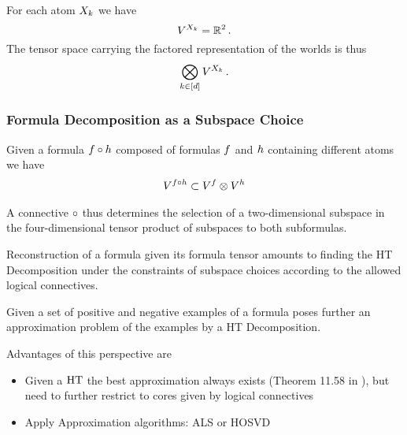For each atom $X_{k}$ we have
	\[ V^{X_{k}} = \mathbb{R}^2 \, . \]
The tensor space carrying the factored representation of the worlds is thus
\begin{align}
	\bigotimes_{k\in[d]}V^{X_{k}} \, .
\end{align}

\subsubsection{Formula Decomposition as a Subspace Choice}

Given a formula $f\circ h$ composed of formulas $f$ and $h$ containing different atoms we have
\begin{align}
	V^{f\circ h} 
	\subset V^{f} \otimes V^{h}
\end{align}

A connective $\circ$ thus determines the selection of a two-dimensional subspace in the four-dimensional tensor product of subspaces to both subformulas.


Reconstruction of a formula given its formula tensor amounts to finding the HT Decomposition under the constraints of subspace choices according to the allowed logical connectives.

Given a set of positive and negative examples of a formula poses further an approximation problem of the examples by a HT Decomposition.

Advantages of this perspective are
\begin{itemize}
	\item Given a $\mathrm{HT}$ the best approximation always exists (Theorem 11.58 in \cite{hackbusch_tensor_2012}), but need to further restrict to cores given by logical connectives 
	\item Apply Approximation algorithms: ALS or HOSVD
\end{itemize}

















